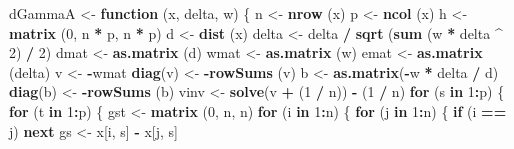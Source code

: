 \documentclass[
  12pt,
]{article}
\newenvironment{Shaded}{\begin{snugshade}}{\end{snugshade}}
\newcommand{\ControlFlowTok}[1]{\textcolor[rgb]{0.13,0.29,0.53}{\textbf{#1}}}
\newcommand{\DecValTok}[1]{\textcolor[rgb]{0.00,0.00,0.81}{#1}}
\newcommand{\FunctionTok}[1]{\textcolor[rgb]{0.13,0.29,0.53}{\textbf{#1}}}
\newcommand{\NormalTok}[1]{#1}
\newcommand{\OtherTok}[1]{\textcolor[rgb]{0.56,0.35,0.01}{#1}}
\newcommand{\SpecialCharTok}[1]{\textcolor[rgb]{0.81,0.36,0.00}{\textbf{#1}}}
\begin{document}
\begin{Shaded}
\begin{Highlighting}[]
\NormalTok{dGammaA }\OtherTok{\textless{}{-}} \ControlFlowTok{function}\NormalTok{ (x, delta, w) \{}
\NormalTok{  n }\OtherTok{\textless{}{-}} \FunctionTok{nrow}\NormalTok{ (x)}
\NormalTok{  p }\OtherTok{\textless{}{-}} \FunctionTok{ncol}\NormalTok{ (x)}
\NormalTok{  h }\OtherTok{\textless{}{-}} \FunctionTok{matrix}\NormalTok{ (}\DecValTok{0}\NormalTok{, n }\SpecialCharTok{*}\NormalTok{ p, n }\SpecialCharTok{*}\NormalTok{ p)}
\NormalTok{  d }\OtherTok{\textless{}{-}} \FunctionTok{dist}\NormalTok{ (x)}
\NormalTok{  delta }\OtherTok{\textless{}{-}}\NormalTok{ delta }\SpecialCharTok{/} \FunctionTok{sqrt}\NormalTok{ (}\FunctionTok{sum}\NormalTok{ (w }\SpecialCharTok{*}\NormalTok{ delta }\SpecialCharTok{\^{}} \DecValTok{2}\NormalTok{) }\SpecialCharTok{/} \DecValTok{2}\NormalTok{)}
\NormalTok{  dmat }\OtherTok{\textless{}{-}} \FunctionTok{as.matrix}\NormalTok{ (d)}
\NormalTok{  wmat }\OtherTok{\textless{}{-}} \FunctionTok{as.matrix}\NormalTok{ (w)}
\NormalTok{  emat }\OtherTok{\textless{}{-}} \FunctionTok{as.matrix}\NormalTok{ (delta)}
\NormalTok{  v }\OtherTok{\textless{}{-}} \SpecialCharTok{{-}}\NormalTok{wmat}
  \FunctionTok{diag}\NormalTok{(v) }\OtherTok{\textless{}{-}} \SpecialCharTok{{-}}\FunctionTok{rowSums}\NormalTok{ (v)}
\NormalTok{  b }\OtherTok{\textless{}{-}} \FunctionTok{as.matrix}\NormalTok{(}\SpecialCharTok{{-}}\NormalTok{w }\SpecialCharTok{*}\NormalTok{ delta }\SpecialCharTok{/}\NormalTok{ d)}
  \FunctionTok{diag}\NormalTok{(b) }\OtherTok{\textless{}{-}} \SpecialCharTok{{-}}\FunctionTok{rowSums}\NormalTok{ (b)}
\NormalTok{  vinv }\OtherTok{\textless{}{-}} \FunctionTok{solve}\NormalTok{(v }\SpecialCharTok{+}\NormalTok{ (}\DecValTok{1} \SpecialCharTok{/}\NormalTok{ n)) }\SpecialCharTok{{-}}\NormalTok{ (}\DecValTok{1} \SpecialCharTok{/}\NormalTok{ n)}
  \ControlFlowTok{for}\NormalTok{ (s }\ControlFlowTok{in} \DecValTok{1}\SpecialCharTok{:}\NormalTok{p) \{}
    \ControlFlowTok{for}\NormalTok{ (t }\ControlFlowTok{in} \DecValTok{1}\SpecialCharTok{:}\NormalTok{p) \{}
\NormalTok{      gst }\OtherTok{\textless{}{-}} \FunctionTok{matrix}\NormalTok{ (}\DecValTok{0}\NormalTok{, n, n)}
      \ControlFlowTok{for}\NormalTok{ (i }\ControlFlowTok{in} \DecValTok{1}\SpecialCharTok{:}\NormalTok{n) \{}
        \ControlFlowTok{for}\NormalTok{ (j }\ControlFlowTok{in} \DecValTok{1}\SpecialCharTok{:}\NormalTok{n) \{}
          \ControlFlowTok{if}\NormalTok{ (i }\SpecialCharTok{==}\NormalTok{ j)}
            \ControlFlowTok{next}
\NormalTok{          gs }\OtherTok{\textless{}{-}}\NormalTok{ x[i, s] }\SpecialCharTok{{-}}\NormalTok{ x[j, s]}

\end{Highlighting}
\end{Shaded}
\end{document}
